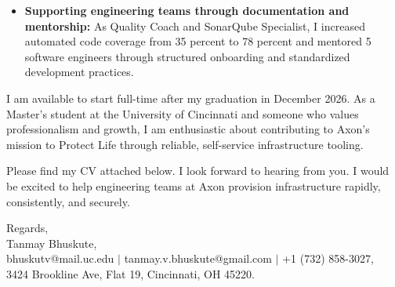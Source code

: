 \documentclass[11pt]{letter}
\begin{document}
\begin{letter}{}
\begin{itemize}[leftmargin=*, itemsep=0.45em]
    \item \textbf{Supporting engineering teams through documentation and mentorship:} As Quality Coach and SonarQube Specialist, I increased automated code coverage from 35 percent to 78 percent and mentored 5 software engineers through structured onboarding and standardized development practices.
\end{itemize}

I am available to start full-time after my graduation in December 2026. As a Master's student at the University of Cincinnati and someone who values professionalism and growth, I am enthusiastic about contributing to Axon's mission to Protect Life through reliable, self-service infrastructure tooling.

Please find my CV attached below. I look forward to hearing from you. I would be excited to help engineering teams at Axon provision infrastructure rapidly, consistently, and securely.

{\setlength{\parskip}{0pt}
Regards,\\
Tanmay Bhuskute,\\
bhuskutv@mail.uc.edu $\mid$ tanmay.v.bhuskute@gmail.com $\mid$ +1 (732) 858-3027,\\
3424 Brookline Ave, Flat 19, Cincinnati, OH 45220.
}

\end{letter}
\end{document}
